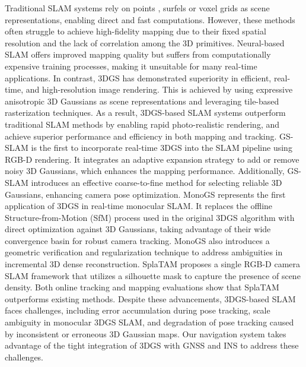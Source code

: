 Traditional SLAM systems rely on points \cite{ref30}, surfels \cite{ref31} or voxel grids \cite{ref32} as scene representations, enabling direct and fast computations. However, these methods often struggle to achieve high-fidelity mapping due to their fixed spatial resolution and the lack of correlation among the 3D primitives. Neural-based SLAM \cite{ref33}\cite{ref34}\cite{ref35} offers improved mapping quality but suffers from computationally expensive training processes, making it unsuitable for many real-time applications. In contrast, 3DGS has demonstrated superiority in efficient, real-time, and high-resolution image rendering. This is achieved by using expressive anisotropic 3D Gaussians as scene representations and leveraging tile-based rasterization techniques. As a result, 3DGS-based SLAM systems outperform traditional SLAM methods by enabling rapid photo-realistic rendering, and achieve superior performance and efficiency in both mapping and tracking. GS-SLAM \cite{ref22} is the first to incorporate real-time 3DGS into the SLAM pipeline using RGB-D rendering. It integrates an adaptive expansion strategy to add or remove noisy 3D Gaussians, which enhances the mapping performance. Additionally, GS-SLAM introduces an effective coarse-to-fine method for selecting reliable 3D Gaussians, enhancing camera pose optimization. MonoGS \cite{ref24} represents the first application of 3DGS in real-time monocular SLAM. It replaces the offline Structure-from-Motion (SfM) process used in the original 3DGS algorithm with direct optimization against 3D Gaussians, taking advantage of their wide convergence basin for robust camera tracking. MonoGS also introduces a geometric verification and regularization technique to address ambiguities in incremental 3D dense reconstruction. SplaTAM \cite{ref25} proposes a single RGB-D camera SLAM framework that utilizes a silhouette mask to capture the presence of scene density. Both online tracking and mapping evaluations show that SplaTAM outperforms existing methods. Despite these advancements, 3DGS-based SLAM faces challenges, including error accumulation during pose tracking, scale ambiguity in monocular 3DGS SLAM, and degradation of pose tracking caused by inconsistent or erroneous 3D Gaussian maps. Our navigation system takes advantage of the tight integration of 3DGS with GNSS and INS to address these challenges.